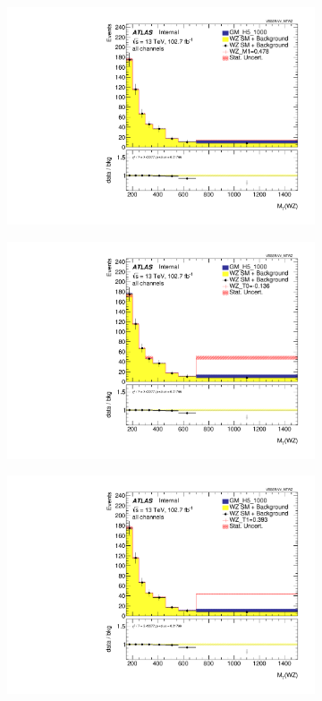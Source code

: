 \documentclass[../Bachelorarbeit.tex]{subfiles}
\begin{document}
\begin{figure}[h]
\begin{subfigure}{0.35\textwidth}
        \includegraphics[width=\textwidth]{Plots/ALL_MTWZ_right_color/GM_H5_1000/M1/2022-05-07/VBSSR/all_VV_MTWZ.pdf}
    \end{subfigure}
    \begin{subfigure}{0.35\textwidth}
        \includegraphics[width=\textwidth]{Plots/ALL_MTWZ_right_color/GM_H5_1000/T0/2022-05-07/VBSSR/all_VV_MTWZ.pdf}
    \end{subfigure}
    \begin{subfigure}{0.35\textwidth}
        \includegraphics[width=\textwidth]{Plots/ALL_MTWZ_right_color/GM_H5_1000/T1/2022-05-07/VBSSR/all_VV_MTWZ.pdf}

\end{subfigure}
\end{figure}
\end{document}
